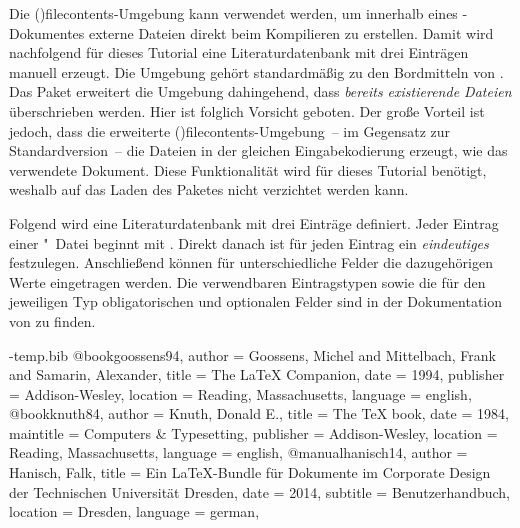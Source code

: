 \documentclass[%
  english,ngerman,%
  cdgeometry=no,DIV=12,%
  cd=false,cdfont=false,cdtitle=true,%
  headings=normal,%
  automark,%
  listof=toc,%
]{tudscrartcl}
\begin{document}
Die \Environment(){filecontents}-Umgebung kann verwendet 
werden, um innerhalb eines -Dokumentes externe Dateien direkt 
beim Kompilieren zu erstellen. Damit wird nachfolgend für dieses Tutorial eine 
Literaturdatenbank  mit drei Einträgen manuell erzeugt.
Die Umgebung gehört standardmäßig zu den Bordmitteln von . Das 
Paket  erweitert die Umgebung dahingehend, dass 
\emph{bereits existierende Dateien} überschrieben werden. Hier ist folglich 
Vorsicht geboten. Der große Vorteil ist jedoch, dass die erweiterte 
\Environment(){filecontents}-Umgebung~-- im Gegensatz 
zur Standardversion~-- die Dateien in der gleichen Eingabekodierung erzeugt, 
wie das verwendete Dokument. Diese Funktionalität wird für dieses Tutorial 
benötigt, weshalb auf das Laden des Paketes  nicht 
verzichtet werden kann. 
%
\begin{Preamble}
\usepackage{filecontents}
\end{Preamble}
%
Folgend wird eine Literaturdatenbank mit drei Einträge definiert. Jeder Eintrag 
einer "~Datei beginnt mit . Direkt 
danach ist für jeden Eintrag ein \emph{eindeutiges}  
festzulegen. Anschließend können für unterschiedliche Felder die dazugehörigen 
Werte eingetragen werden. Die verwendbaren Eintragstypen sowie die für den 
jeweiligen Typ obligatorischen und optionalen Felder sind in der Dokumentation 
von  zu finden.
%
\begin{Preamble*}
\begin{filecontents}{\jobname-temp.bib}
@book{goossens94,
  author    = {Goossens, Michel and Mittelbach, Frank
               and Samarin, Alexander},
  title     = {The \LaTeX{} Companion},
  date      = {1994},
  publisher = {Addison-Wesley},
  location  = {Reading, Massachusetts},
  language  = {english},
}
@book{knuth84,
  author    = {Knuth, Donald E.},
  title     = {The \TeX{} book},
  date      = {1984},
  maintitle = {Computers \& Typesetting},
  publisher = {Addison-Wesley},
  location  = {Reading, Massachusetts},
  language  = {english},
}
@manual{hanisch14,
  author    = {Hanisch, Falk},
  title     = {Ein \LaTeX-Bundle für Dokumente im Corporate Design der 
               Technischen Universität Dresden},
  date      = {2014},
  subtitle  = {Benutzerhandbuch},
  location  = {Dresden},
  language  = {german},
}
\end{filecontents}
\end{Preamble*}
\end{document}
